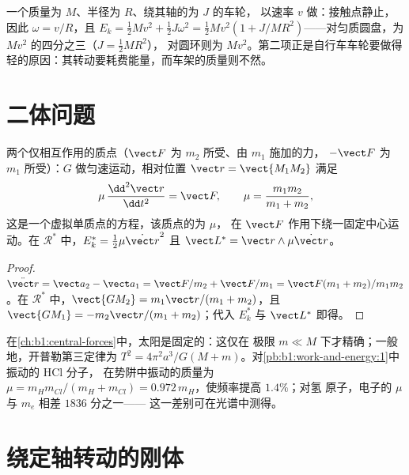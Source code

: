 \begin{example}[滚动的车轮]\label{ex:b1:systems-of-points:rolling}
一个质量为 $M$、半径为 $R$、绕其轴的为 $J$ 的车轮，
以速率 $v$ 做：接触点静止，因此
$\omega = v/R$，且 $E_k = \tfrac12 Mv^2 + \tfrac12 J\omega^2 = \tfrac12 Mv^2(1 +
J/MR^2)$——对匀质圆盘，为 $Mv^2$ 的四分之三（$J = \tfrac12 MR^2$），
对圆环则为 $Mv^2$。第二项正是自行车车轮要做得
轻的原因：其转动要耗费能量，而车架的质量则不然。
\end{example}

\section{二体问题}

\begin{proposition}[约化质量]\label{prop:b1:systems-of-points:twobody}
两个仅相互作用的质点（$\vect F$ 为 $m_2$ 所受、由 $m_1$ 施加的力，
$-\vect F$ 为 $m_1$ 所受）：$G$ 做匀速运动，相对位置
$\vect r = \vect{M_1M_2}$ 满足
\[
\mu\,\frac{\dd^2\vect r}{\dd t^2} = \vect F, \qquad \mu = \frac{m_1m_2}{m_1 + m_2},
\]
这是一个虚拟单质点的方程，该质点的\emph{}为 $\mu$，
在 $\vect F$ 作用下绕一固定中心运动。在 $\mathcal R^*$ 中，$E_k^* =
\tfrac12\mu\dot{\vect r}^2$ 且 $\vect L^* = \vect r\wedge\mu\dot{\vect r}$。
\end{proposition}

\begin{proof}
$\ddot{\vect r} = \vect a_2 - \vect a_1 = \vect F/m_2 + \vect F/m_1 = \vect F(m_1 +
m_2)/m_1m_2$。在 $\mathcal R^*$ 中，$\vect{GM_2} = m_1\vect r/(m_1 + m_2)$，且
$\vect{GM_1} = -m_2\vect r/(m_1 + m_2)$；代入 $E_k^*$ 与 $\vect L^*$ 即得。
\end{proof}

\begin{example}[当中心也运动时]\label{ex:b1:systems-of-points:reduced}
在\cref{ch:b1:central-forces}中，太阳是固定的：这仅在
极限 $m \ll M$ 下才精确；一般地，开普勒第三定律为 $T^2 = 4\pi^2a^3/G(M +
m)$。对\cref{pb:b1:work-and-energy:1}中振动的 HCl 分子，
在势阱中振动的质量为 $\mu = m_Hm_{Cl}/(m_H + m_{Cl}) =
0.972\,m_H$，使频率提高 $1.4\%$；对氢
原子，电子的 $\mu$ 与 $m_e$ 相差 $1836$ 分之一——
这一差别可在光谱中测得。
\end{example}

\section{绕定轴转动的刚体}

